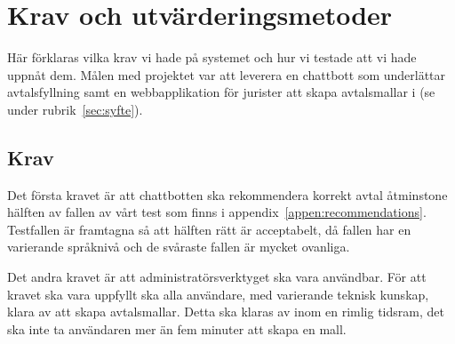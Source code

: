 \documentclass[a4paper,12pt]{article}
\begin{document}
\section{Krav och utvärderingsmetoder}\label{sec:krav}






Här förklaras vilka krav vi hade på systemet och hur vi testade att vi hade uppnåt dem.
Målen med projektet var att leverera en chattbott som underlättar avtalsfyllning samt en webbapplikation för jurister att skapa avtalsmallar i (se under rubrik~\ref{sec:syfte}).

\subsection{Krav}

Det första kravet är att chattbotten ska rekommendera korrekt avtal åtminstone hälften  av fallen av vårt test som finns i appendix~\ref{appen:recommendations}. Testfallen är framtagna så att hälften rätt är acceptabelt, då fallen har en varierande språknivå och de svåraste fallen är mycket ovanliga.

Det andra kravet är att administratörsverktyget ska vara användbar. För att kravet ska vara uppfyllt ska alla användare, med varierande teknisk kunskap, klara av att skapa avtalsmallar. Detta ska klaras av inom en rimlig tidsram, det ska inte ta användaren mer än fem minuter att skapa en mall. 
\end{document}
